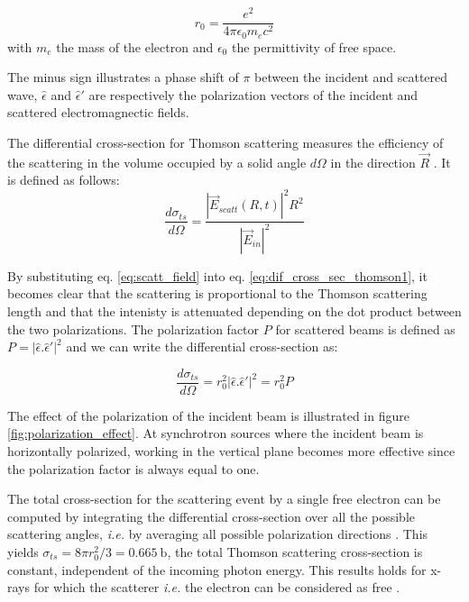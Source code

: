\begin{equation}
    \label{eq:scatt_thomson_scat_length}
    r_0 = \frac{e^2} {4\pi\epsilon_0 m_e c^2}
\end{equation}
with $m_e$ the mass of the electron and $\epsilon_0$ the permittivity of free space.

The minus sign illustrates a phase shift of $\pi$ between the incident and scattered wave, $\hat{\epsilon}$ and $\hat{\epsilon}'$ are respectively the polarization vectors of the incident and scattered electromagnectic fields.

The differential cross-section for Thomson scattering measures the efficiency of the scattering in the volume occupied by a solid angle $d\Omega$ in the direction $\vec{R}$ \parencite{NielsenMcMorrow}. It is defined as follows:
\begin{equation}
    \label{eq:dif_cross_sec_thomson1}
    \frac{d\sigma_{ts}} {d \Omega} = \frac{ |\vec{E}_{scatt}(R, t)|^2 R^2} {|\vec{E}_{in}|^2}
\end{equation}

By substituting eq. \ref{eq:scatt_field} into eq. \ref{eq:dif_cross_sec_thomson1}, it becomes clear that the scattering is proportional to the Thomson scattering length and that the intenisty is attenuated depending on the dot product between the two polarizations.
The polarization factor $P$ for scattered beams is defined as $P =  | \hat{\epsilon}.\hat{\epsilon}'|^2$ and we can write the differential cross-section as:

\begin{equation}
    \frac{d\sigma_{ts}} {d \Omega} = r_0^2 | \hat{\epsilon}.\hat{\epsilon}'|^2 = r_0^2 P
\end{equation}

The effect of the polarization of the incident beam is illustrated in figure \ref{fig:polarization_effect}.
At synchrotron sources where the incident beam is horizontally polarized, working in the vertical plane becomes more effective since the polarization factor is always equal to one.

The total cross-section for the scattering event by a single free electron can be computed by integrating the differential cross-section over all the possible scattering angles, \textit{i.e.} by averaging all possible polarization directions \parencite{Willmott}.
This yields $\sigma_{ts} = 8 \pi r_0^2 /3 = 0.665 \:\si{\barn}$, the total Thomson scattering cross-section is constant, independent of the incoming photon energy. This results holds for x-rays for which the scatterer \textit{i.e.} the electron can be considered as free \parencite{Willmott}.

